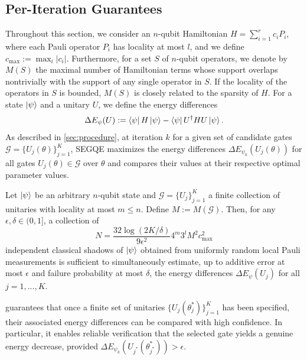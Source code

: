 \subsection{Per-Iteration Guarantees}
\label{sec:guarantees}
Throughout this section, we consider an $n$-qubit Hamiltonian $H=\sum_{i=1}^r c_iP_i$, where each Pauli operator $P_i$ has locality at most $l$, and we define $c_\mathrm{max}:=\max_i|c_i|$. Furthermore, for a set $S$ of $n$-qubit operators, we denote by $M(S)$ the maximal number of Hamiltonian terms whose support overlaps nontrivially with the support of any single operator in $S$. If the locality of the operators in $S$ is bounded, $M(S)$ is closely related to the sparsity of $H$. For a state $\ket{\psi}$ and a unitary $U$, we define the energy differences
\begin{equation}
    \Delta E_{\psi}(U):=\bra{\psi}H\ket{\psi}-\bra{\psi}U^\dagger HU\ket{\psi}.
\end{equation}
As described in \cref{sec:procedure}, at iteration $k$ for a given set of candidate gates $\mathcal{G}=\{U_j(\theta)\}^K_{j=1}$, SEGQE maximizes the energy differences $\Delta E_{\psi_k}\left(U_j(\theta)\right)$ for all gates $U_j(\theta)\in\mathcal{G}$ over $\theta$ and compares their values at their respective optimal parameter values. 
\begin{theorem}
    \label{theorem1}
    Let $\ket{\psi}$ be an arbitrary $n$-qubit state and $\mathcal{G}=\{U_j\}_{j=1}^K$ a finite collection of unitaries with locality at most $m\leq n$. Define $M := M(\mathcal{G})$. Then, for any $\epsilon, \delta \in (0,1]$, a collection of
    \begin{equation}
        N =\frac{32\log\left(2K/\delta\right)}{9\epsilon^2}4^m3^{l}M^2c_\mathrm{max}^2
    \end{equation}
    independent classical shadows of $\ket{\psi}$ obtained from uniformly random local Pauli measurements is sufficient to simultaneously estimate, up to additive error at most $\epsilon$ and failure probability at most $\delta$, the energy differences $\Delta E_{\psi}(U_j)$ for all $j=1,...,K$.
\end{theorem}
 guarantees that once a finite set of unitaries $\{U_j(\theta^*_j)\}_{j=1}^K$ has been specified, their associated energy differences can be compared with high confidence. In particular, it enables reliable verification that the selected gate yields a genuine energy decrease, provided $\Delta E_{\psi_k}(U_{j^*}(\theta^*_{j^*}))>\epsilon$.
